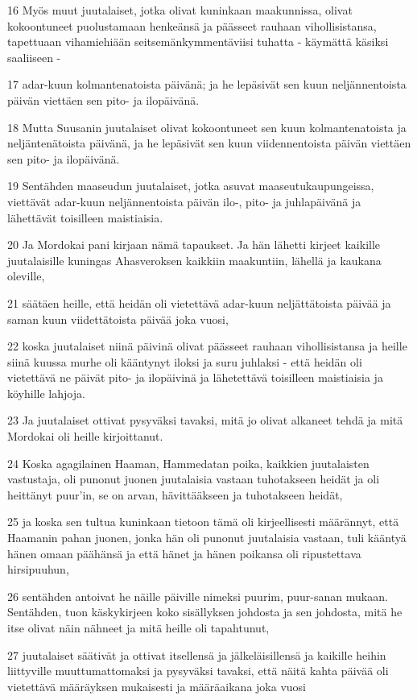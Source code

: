 \par 16 Myös muut juutalaiset, jotka olivat kuninkaan maakunnissa, olivat kokoontuneet puolustamaan henkeänsä ja päässeet rauhaan vihollisistansa, tapettuaan vihamiehiään seitsemänkymmentäviisi tuhatta - käymättä käsiksi saaliiseen -
\par 17 adar-kuun kolmantenatoista päivänä; ja he lepäsivät sen kuun neljännentoista päivän viettäen sen pito- ja ilopäivänä.
\par 18 Mutta Suusanin juutalaiset olivat kokoontuneet sen kuun kolmantenatoista ja neljäntenätoista päivänä, ja he lepäsivät sen kuun viidennentoista päivän viettäen sen pito- ja ilopäivänä.
\par 19 Sentähden maaseudun juutalaiset, jotka asuvat maaseutukaupungeissa, viettävät adar-kuun neljännentoista päivän ilo-, pito- ja juhlapäivänä ja lähettävät toisilleen maistiaisia.
\par 20 Ja Mordokai pani kirjaan nämä tapaukset. Ja hän lähetti kirjeet kaikille juutalaisille kuningas Ahasveroksen kaikkiin maakuntiin, lähellä ja kaukana oleville,
\par 21 säätäen heille, että heidän oli vietettävä adar-kuun neljättätoista päivää ja saman kuun viidettätoista päivää joka vuosi,
\par 22 koska juutalaiset niinä päivinä olivat päässeet rauhaan vihollisistansa ja heille siinä kuussa murhe oli kääntynyt iloksi ja suru juhlaksi - että heidän oli vietettävä ne päivät pito- ja ilopäivinä ja lähetettävä toisilleen maistiaisia ja köyhille lahjoja.
\par 23 Ja juutalaiset ottivat pysyväksi tavaksi, mitä jo olivat alkaneet tehdä ja mitä Mordokai oli heille kirjoittanut.
\par 24 Koska agagilainen Haaman, Hammedatan poika, kaikkien juutalaisten vastustaja, oli punonut juonen juutalaisia vastaan tuhotakseen heidät ja oli heittänyt puur'in, se on arvan, hävittääkseen ja tuhotakseen heidät,
\par 25 ja koska sen tultua kuninkaan tietoon tämä oli kirjeellisesti määrännyt, että Haamanin pahan juonen, jonka hän oli punonut juutalaisia vastaan, tuli kääntyä hänen omaan päähänsä ja että hänet ja hänen poikansa oli ripustettava hirsipuuhun,
\par 26 sentähden antoivat he näille päiville nimeksi puurim, puur-sanan mukaan. Sentähden, tuon käskykirjeen koko sisällyksen johdosta ja sen johdosta, mitä he itse olivat näin nähneet ja mitä heille oli tapahtunut,
\par 27 juutalaiset säätivät ja ottivat itsellensä ja jälkeläisillensä ja kaikille heihin liittyville muuttumattomaksi ja pysyväksi tavaksi, että näitä kahta päivää oli vietettävä määräyksen mukaisesti ja määräaikana joka vuosi
